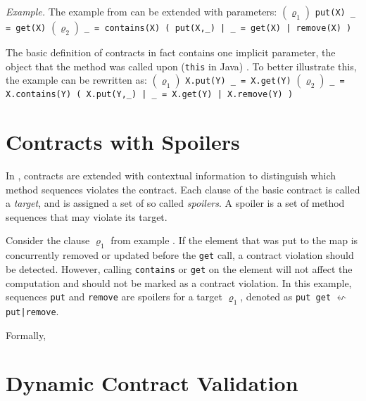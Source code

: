 \emph{Example.} The example from  can be extended with parameters:
 \newline
    $(\varrho_1)$ \texttt{put(X) \_ = get(X)} \newline
    $(\varrho_2)$ \texttt{\_ = contains(X) ( put(X,\_) | \_ = get(X) | remove(X) )}
    \newline

The basic definition of contracts in fact contains one implicit parameter, the
object that the method was called upon (\texttt{this} in Java)
\cite{FITPUB10817}. To better illustrate this, the example can be rewritten as:
 \newline
    $(\varrho_1)$ \texttt{X.put(Y) \_ = X.get(Y)} \newline
    $(\varrho_2)$ \texttt{\_ = X.contains(Y) ( X.put(Y,\_) | \_ = X.get(Y) | X.remove(Y) )}


\section{Contracts with Spoilers}

In \cite{FITPUB11510}, contracts are extended with contextual information to
distinguish which method sequences violates the contract. Each clause of the
basic contract is called a \emph{target}, and is assigned a set of so called
\emph{spoilers}. A spoiler is a set of method sequences that may violate its
target.

Consider the clause $\varrho_1$ from example . If the element that was put to the map is concurrently removed or
updated before the \texttt{get} call, a contract violation should be detected.
However, calling \texttt{contains} or \texttt{get} on the element will not
affect the computation and should not be marked as a contract violation. In this
example, sequences \texttt{put} and \texttt{remove} are spoilers for a target
$\varrho_1$, denoted as \texttt{put get} $\leftsquigarrow$
\texttt{put|remove}.

Formally, \todo{}


\section{Dynamic Contract Validation}




